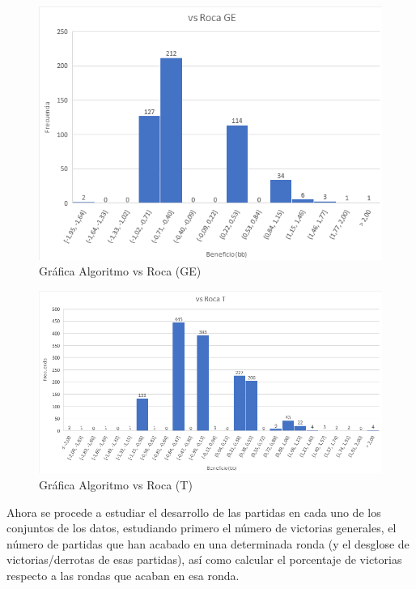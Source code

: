 \begin{figure}[h]
\centering
\includegraphics[width=1\textwidth]{figuras/AvRGE.png}   
\caption{Gráfica Algoritmo vs Roca (GE)}
\label{fig:AvRGE}
\end{figure}

\begin{figure}[h]
\centering
\includegraphics[width=1\textwidth]{figuras/AvRT.png}   
\caption{Gráfica Algoritmo vs Roca (T)}
\label{fig:AvRGT}
\end{figure}

Ahora se procede a estudiar el desarrollo de las partidas en cada uno de los conjuntos de los datos, estudiando primero el número de victorias generales, el número de partidas que han acabado en una determinada ronda (y el desglose de victorias/derrotas de esas partidas), así como calcular el porcentaje de victorias respecto a las rondas que acaban en esa ronda.


